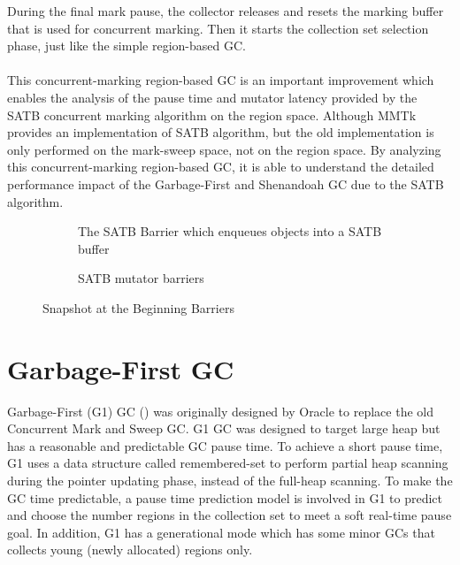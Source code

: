 During the final mark pause, the collector releases and resets the marking buffer that
is used for concurrent marking. Then it starts the collection set selection phase, just like the
simple region-based GC.
\\\\

This concurrent-marking region-based GC is an important improvement which enables
the analysis of the pause time and mutator latency provided by the SATB concurrent marking algorithm on the region space.
Although MMTk provides an implementation of SATB algorithm, but the old implementation
is only performed on the mark-sweep space, not on the region space.
By analyzing this concurrent-marking region-based GC, it is able to understand the
detailed performance impact of the Garbage-First and Shenandoah GC due to the SATB algorithm.

\begin{figure}
  \centering
  \begin{subfigure}[a]{\textwidth}
    
    \caption{The SATB Barrier which enqueues objects into a SATB buffer}
    \label{fig:c:hello}
  \end{subfigure}

  \begin{subfigure}[b]{\textwidth}
    
    \caption{SATB mutator barriers}
    \label{fig:c:hello}
  \end{subfigure}

  \caption{Snapshot at the Beginning Barriers}
  \label{fig:satbbarrier}
\end{figure}

\section{Garbage-First GC}
\label{sec:g1gc}

Garbage-First (G1) GC (\cite{detlefs2004garbage}) was originally designed by Oracle to replace
the old Concurrent Mark and Sweep GC. G1 GC was designed to target large heap but
has a reasonable and predictable GC pause time. To achieve a short pause time, G1
uses a data structure called remembered-set to perform partial heap scanning during the
pointer updating phase, instead of the full-heap scanning. To make the GC time predictable,
a pause time prediction model is involved in G1 to predict and choose the number regions in the
collection set to meet a soft real-time pause goal. In addition, G1 has a generational
mode which has some minor GCs that collects young (newly allocated) regions only.

